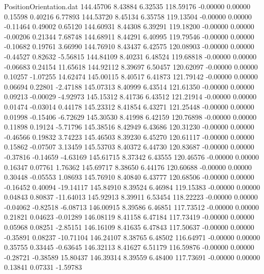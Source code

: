 \begin{filecontents}{PositionOrientation.dat}
 144.45706    8.43884    6.32535   118.59176   -0.00000    0.00000    0.15598    0.40216    6.77893
 144.53720    8.45134    6.35758   119.13504   -0.00000    0.00000   -0.11464    0.49002    0.65120
 144.60931    8.44308    6.39291   119.18200   -0.00000    0.00000   -0.00206    0.21344    7.68748
 144.68911    8.44291    6.40995   119.79546   -0.00000    0.00000   -0.10682    0.19761    3.66990
 144.76910    8.43437    6.42575   120.08903   -0.00000    0.00000   -0.44527    0.82632   -5.56815
 144.84109    8.40231    6.48524   119.68818   -0.00000    0.00000   -0.06683    0.24154   11.65618
 144.92112    8.39697    6.50457   120.62097   -0.00000    0.00000    0.10257   -1.07255   14.62474
 145.00115    8.40517    6.41873   121.79142   -0.00000    0.00000    0.06694    0.22801   -2.47188
 145.07313    8.40999    6.43514   121.61350   -0.00000    0.00000    0.09213   -0.00029   -4.92973
 145.15312    8.41736    6.43512   121.21914   -0.00000    0.00000    0.01474   -0.03014    0.44178
 145.23312    8.41854    6.43271   121.25448   -0.00000    0.00000    0.01998   -0.15406   -6.72629
 145.30530    8.41998    6.42159   120.76898   -0.00000    0.00000    0.11898    0.19124   -5.71796
 145.38516    8.42949    6.43686   120.31230   -0.00000    0.00000   -0.46566    0.19832    3.74223
 145.46503    8.39230    6.45270   120.61117   -0.00000    0.00000    0.15862   -0.07507    3.13459
 145.53703    8.40372    6.44730   120.83687   -0.00000    0.00000   -0.37816   -0.14659   -4.63169
 145.61715    8.37342    6.43555   120.46576   -0.00000    0.00000    0.16347    0.07761    1.76362
 145.69717    8.38650    6.44176   120.60688   -0.00000    0.00000    0.30448   -0.05553    1.08693
 145.76910    8.40840    6.43777   120.68506   -0.00000    0.00000   -0.16452    0.40094  -19.14117
 145.84910    8.39524    6.46984   119.15383   -0.00000    0.00000    0.04843    0.80837  -11.64013
 145.92913    8.39911    6.53454   118.22223   -0.00000    0.00000   -0.04062   -0.82518   -6.08713
 146.00915    8.39586    6.46851   117.73512   -0.00000    0.00000    0.21821    0.04623   -0.01289
 146.08119    8.41158    6.47184   117.73419   -0.00000    0.00000    0.05968    0.08251   -2.85151
 146.16109    8.41635    6.47843   117.50637   -0.00000    0.00000   -0.35891    0.08237  -10.71104
 146.24107    8.38765    6.48502   116.64971   -0.00000    0.00000    0.35755    0.33445   -0.63645
 146.32113    8.41627    6.51179   116.59876   -0.00000    0.00000   -0.28721   -0.38589   15.80437
 146.39314    8.39559    6.48400   117.73691   -0.00000    0.00000    0.13841    0.07331   -1.59783

\end{filecontents}
